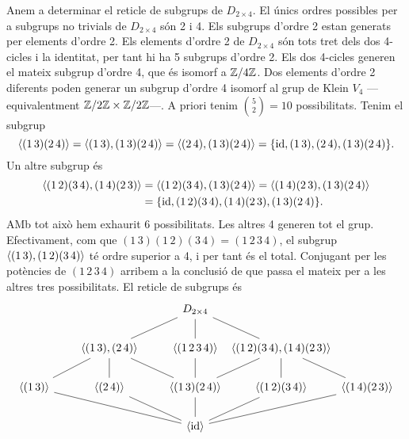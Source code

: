 \documentclass[12pt]{article}
\begin{document}
Anem a determinar el reticle de subgrups de \( D_{2 \times 4} \). El únics ordres
possibles per a subgrups no trivials de \( D_{2 \times 4} \) són 2 i 4. Els subgrups
d'ordre 2 estan generats per elements d'ordre 2. Els elements d'ordre 2 de \( D_{2 \times
4} \) són tots tret dels dos 4-cicles i la identitat, per tant hi ha 5 subgrups d'ordre 2.
Els dos 4-cicles generen el mateix subgrup d'ordre 4, que és isomorf a \( \mathbb{Z}/4\mathbb{Z} \). Dos
elements d'ordre 2 diferents poden generar un subgrup d'ordre 4 isomorf al grup de Klein \( V_4
\) ---equivalentment \( \mathbb{Z}/2\mathbb{Z} \times \mathbb{Z}/2\mathbb{Z} \)---. A priori tenim \( \binom{5}{2} = 10 \)
possibilitats. Tenim el subgrup
\begin{equation*}
	\left\langle (1\,3)(2\,4) \right\rangle = \left\langle (1\,3), (1\,3)(2\,4) \right\rangle = \left\langle (2\,4), (1\,3)(2\,4) \right\rangle = \{ \mathrm{id},
		(1\,3), (2\,4), (1\,3)(2\,4) \}.
\end{equation*}
Un altre subgrup és
\begin{align*}
	\left\langle (1\,2)(3\,4), (1\,4)(2\,3) \right\rangle & = \left\langle (1\,2)(3\,4), (1\,3)(2\,4) \right\rangle =
	\left\langle (1\,4)(2\,3), (1\,3)(2\,4) \right\rangle \\
																	 & = \{ \mathrm{id}, (1\,2)(3\,4), (1\,4)(2\,3),
																	 (1\,3)(2\,4) \}.
\end{align*}
AMb tot això hem exhaurit 6 possibilitats. Les altres 4 generen tot el grup. Efectivament,
com que \( (1\,3)(1\,2)(3\,4) = (1\,2\,3\,4) \), el subgrup \( \left\langle (1\,3), (1\,2)(3\,4) \right\rangle
\) té ordre superior a 4, i per tant és el total. Conjugant per les potències de \(
(1\,2\,3\,4) \) arribem a la conclusió de que passa el mateix per a les altres tres
possibilitats. El reticle de subgrups és
\begin{equation*}
	\begin{tikzcd}[column sep = 0.8]
		& & D_{2 \times 4} \arrow[dl, no head] \arrow[d, no head] \arrow[dr, no head] \\
		& \makebox[\widthof{$\gen{(1\,2)(3\,4), (1\,4)(2\,3)}$}][c]{$\gen{(1\,3),(2\,4)}$} & \gen{(1\,2\,3\,4)} & \gen{(1\,2)(3\,4), (1\,4)(2\,3)} \\
		\gen{(1\,3)} \arrow[ur, no head] & \gen{(2\,4)} \arrow[u, no head] &
		\gen{(1\,3)(2\,4)} \arrow[ul, no head] \arrow[u, no head] \arrow[ur, no head] &
		\gen{(1\,2)(3\,4)} \arrow[u, no head] & \gen{(1\,4)(2\,3)} \arrow[ul, no head] \\
																					& & \gen{\id} \arrow[ull, no head] \arrow[ul, no
																					head] \arrow[u, no head] \arrow[ur, no head]
																					\arrow[urr, no head] 
	\end{tikzcd}
\end{equation*}
\end{document}
